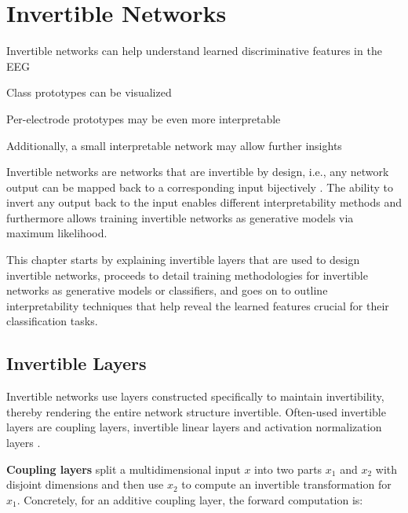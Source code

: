 \chapter{Invertible Networks}\label{invertible-networks}

\begin{startbox}{Invertible networks can help understand learned discriminative features in the EEG}
\item Class prototypes can be visualized
\item Per-electrode prototypes may be even more interpretable
\item Additionally, a small interpretable network may allow further insights
\end{startbox}


Invertible networks are networks that are invertible by design, i.e.,
any network output can be mapped back to a corresponding input
bijectively \citep{DBLP:journals/corr/DinhKB14,DBLP:journals/corr/DinhSB16,DBLP:conf/nips/KingmaD18,DBLP:conf/icml/RezendeM15,DBLP:conf/icml/HoCSDA19}.
The ability to invert any output back to the input enables different
interpretability methods and furthermore allows training invertible
networks as generative models via maximum likelihood.

This chapter starts by explaining invertible layers that are used to
design invertible networks, proceeds to detail training methodologies
for invertible networks as generative models or classifiers, and goes on
to outline interpretability techniques that help reveal the learned
features crucial for their classification tasks.

\section{Invertible Layers}\label{invertible-layers}

    Invertible networks use layers constructed specifically to maintain
invertibility, thereby rendering the entire network structure
invertible. Often-used invertible layers are coupling layers, invertible
linear layers and activation normalization layers
\citep{DBLP:conf/nips/KingmaD18}.

\textbf{Coupling layers} split a multidimensional input $x$ into two
parts $x_1$ and $x_2$ with disjoint dimensions and then use $x_2$
to compute an invertible transformation for $x_1$. Concretely, for an
additive coupling layer, the forward computation is:


